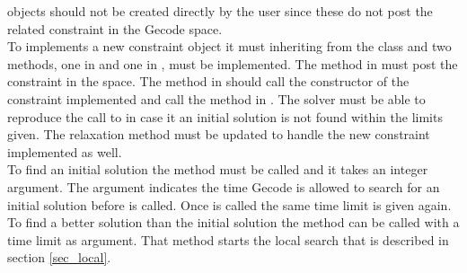 objects should not be created directly by the user since these do not post the related constraint in the Gecode space. 
\\ 
To implements a new constraint object it must inheriting from the  class 
and two methods, one in  and one in , must be implemented. The method in 
 must post the constraint in the  space. The method in  
should call the constructor of the constraint implemented and call the method in . The solver must 
be able to reproduce the call to  in case it an initial solution is not found within the limits 
given. The relaxation method must be updated to handle the new constraint implemented as well.  \\
To find an initial solution the method  must be called and it takes an integer argument. The 
argument indicates the time Gecode is allowed to search for an initial solution before  is called. Once 
 is called the same time limit is given again. \\
To find a better solution than the initial solution the method  can be called with a time 
limit as argument. That method starts the local search that is described in section \ref{sec_local}. 